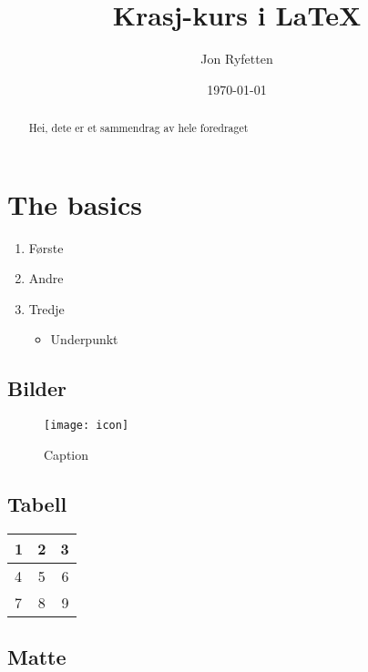 \documentclass[a4paper]{article}
\title{Krasj-kurs i \LaTeX}
\author{Jon Ryfetten }
\date{\today}
\begin{document}
\maketitle

\begin{abstract}
    Hei, dete er et sammendrag av hele foredraget
    \blindtext
\end{abstract}

\section{The basics}
    \begin{enumerate}
        \item Første
        \item Andre
        \item Tredje
        \begin{itemize}
            \item Underpunkt
            
        \end{itemize}
    \end{enumerate}
    
\subsection{Bilder}

\begin{figure}[h]
    \centering
    \texttt{[image: icon]}
    \caption{Caption}
    \label{fig:icon}
\end{figure}


\subsection{Tabell}

    \begin{table}
        \centering      %
        \begin{tabular} {| l | c | r |} \hline
            1 & 2 & 3 \\ \hline
            4 & 5 & 6 \\ \hline
            7 & 8 & 9 \\ \hline
        \end{tabular}
    \end{table}

\subsection{Matte}
\end{document}
